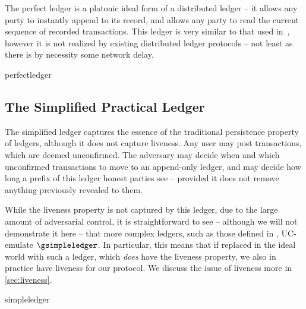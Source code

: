 The perfect ledger is a platonic ideal form of a distributed ledger -- it allows
any party to instantly append to its record, and allows any party to read the
current sequence of recorded transactions. This ledger is very similar to that
used in~\cite{EC:KiaZhoZik16}, however it is not realized by existing distributed ledger
protocols -- not least as there is by necessity some network delay.

{perfectledger}

\subsection{The Simplified Practical Ledger}

The simplified ledger captures the essence of the traditional persistence
property of ledgers, although it does not capture liveness. Any user may post
transactions, which are deemed unconfirmed. The adversary may decide when and
which unconfirmed transactions to move to an append-only ledger, and may decide
how long a prefix of this ledger honest parties see -- provided it does not
remove anything previously revealed to them.

While the liveness property is not captured by this ledger, due to the large
amount of adversarial control, it is straightforward to see -- although we will
not demonstrate it here -- that more complex ledgers, such as those defined in
\cite{C:BMTZ17,CCS:BGKRZ18}, UC-emulate $\gsimpleledger$. In particular, this
means that if replaced in the ideal world with such a ledger, which \emph{does}
have the liveness property, we also in practice have liveness for our protocol.
We discuss the issue of liveness more in \autoref{sec:liveness}.

{simpleledger}

